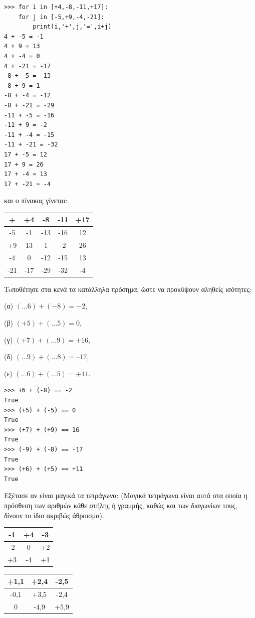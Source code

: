 \begin{lstlisting}
>>> for i in [+4,-8,-11,+17]:
    for j in [-5,+9,-4,-21]:
        print(i,'+',j,'=',i+j)
4 + -5 = -1
4 + 9 = 13
4 + -4 = 0
4 + -21 = -17
-8 + -5 = -13
-8 + 9 = 1
-8 + -4 = -12
-8 + -21 = -29
-11 + -5 = -16
-11 + 9 = -2
-11 + -4 = -15
-11 + -21 = -32
17 + -5 = 12
17 + 9 = 26
17 + -4 = 13
17 + -21 = -4        
\end{lstlisting}
και ο πίνακας γίνεται:
\begin{table}[h]
\begin{tabular}{|c|c|c|c|c|}
\hline
+ &  +4&-8 &-11&+17\\\hline
-5&  -1&-13&-16& 12\\\hline
+9&  13&1  & -2& 26\\\hline
-4&   0&-12&-15& 13\\\hline
-21&-17&-29&-32& -4\\\hline
\end{tabular}
\end{table}
\begin{exercise}
Toποθέτησε στα κενά τα κατάλληλα πρόσημα, ώστε να προκύψουν αληθείς ισότητες:

(α) $(\ldots 6) + (-8) = -2$, 

(β) $(+5) + (\ldots 5) = 0$, 

(γ) $(+7) + (\ldots 9) = +16$,

(δ) $(\ldots 9) + (\ldots 8) = –17$, 

(ε) $(\ldots 6) + (\ldots 5) = +11$.

\end{exercise}
\begin{lstlisting}
>>> +6 + (-8) == -2
True
>>> (+5) + (-5) == 0
True
>>> (+7) + (+9) == 16
True
>>> (-9) + (-8) == -17
True
>>> (+6) + (+5) == +11
True
\end{lstlisting}
\begin{exercise}
Εξέτασε αν είναι μαγικά τα τετράγωνα:
(Μαγικά τετράγωνα είναι αυτά στα οποία
η πρόσθεση των αριθμών κάθε στήλης ή
γραμμής, καθώς και των διαγωνίων
τους, δίνουν το ίδιο ακριβώς άθροισμα).
\begin{table}[h]
\begin{tabular}{|c|c|c|}
\hline
-1&+4&-3\\\hline
-2&0&+2\\\hline
+3&-4&+1\\\hline
\end{tabular}
\end{table}
\begin{table}[h]
\begin{tabular}{|c|c|c|}
\hline
+1,1&+2,4&-2,5\\\hline
-0,1&+3,5&-2,4\\\hline
0&-4,9&+5,9\\\hline
\end{tabular}
\end{table}

\end{exercise}

